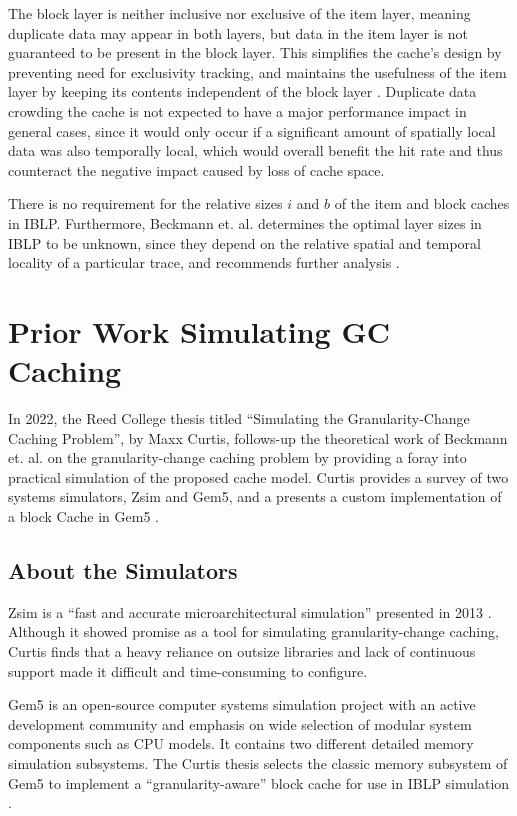 \documentclass[12pt,twoside]{reedthesis}
\begin{document}
	The block layer is neither inclusive nor exclusive of the item layer, meaning duplicate data may appear in both layers, but data in the item layer is not guaranteed to be present in the block layer. This simplifies the cache's design by preventing need for exclusivity tracking, and maintains the usefulness of the item layer by keeping its contents independent of the block layer \cite{beckmann}. Duplicate data crowding the cache is not expected to have a major performance impact in general cases, since it would only occur if a significant amount of spatially local data was also temporally local, which would overall benefit the hit rate and thus counteract the negative impact caused by loss of cache space.
	
	There is no requirement for the relative sizes $i$ and $b$ of the item and block caches in IBLP. Furthermore, Beckmann et. al. determines the optimal layer sizes in IBLP to be unknown, since they depend on the relative spatial and temporal locality of a particular trace, and recommends further analysis \cite{beckmann}.

\section{Prior Work Simulating GC Caching}

In 2022, the Reed College thesis titled ``Simulating the Granularity-Change Caching Problem'', by Maxx Curtis, follows-up the theoretical work of Beckmann et. al. on the granularity-change caching problem by providing a foray into practical simulation of the proposed cache model. Curtis provides a survey of two systems simulators, Zsim and Gem5, and a presents a custom implementation of a block Cache in Gem5 \cite{curtis}.

	\subsection*{About the Simulators}

	Zsim is a ``fast and accurate microarchitectural simulation'' presented in 2013 \cite{zsim}. Although it showed promise as a tool for simulating granularity-change caching, Curtis finds that a heavy reliance on outsize libraries and lack of continuous support made it difficult and time-consuming to configure.

	Gem5 is an open-source computer systems simulation project with an active development community and emphasis on wide selection of modular system components such as CPU models. It contains two different detailed memory simulation subsystems. The Curtis thesis selects the classic memory subsystem of Gem5 to implement a ``granularity-aware'' block cache for use in IBLP simulation \cite{curtis}.
\end{document}

